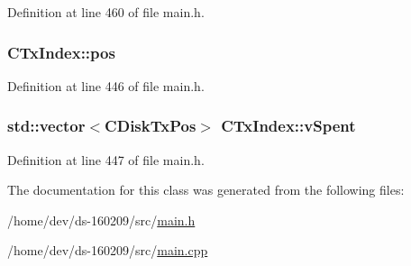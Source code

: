 Definition at line 460 of file main.\+h.

\hypertarget{class_c_tx_index_ac68a69ed4335b3f50b954c71ec0a9c32}{}
\subsubsection[{pos}]{ C\+Tx\+Index\+::pos}\label{class_c_tx_index_ac68a69ed4335b3f50b954c71ec0a9c32}


Definition at line 446 of file main.\+h.

\hypertarget{class_c_tx_index_a88317d56c02acd1faec4863bcb293d2c}{}
\subsubsection[{v\+Spent}]{\setlength{\rightskip}{0pt plus 5cm}std\+::vector$<${\bf C\+Disk\+Tx\+Pos}$>$ C\+Tx\+Index\+::v\+Spent}\label{class_c_tx_index_a88317d56c02acd1faec4863bcb293d2c}


Definition at line 447 of file main.\+h.



The documentation for this class was generated from the following files\+:\begin{DoxyCompactItemize}
\item 
/home/dev/ds-\/160209/src/\hyperlink{main_8h}{main.\+h}\item 
/home/dev/ds-\/160209/src/\hyperlink{main_8cpp}{main.\+cpp}\end{DoxyCompactItemize}
